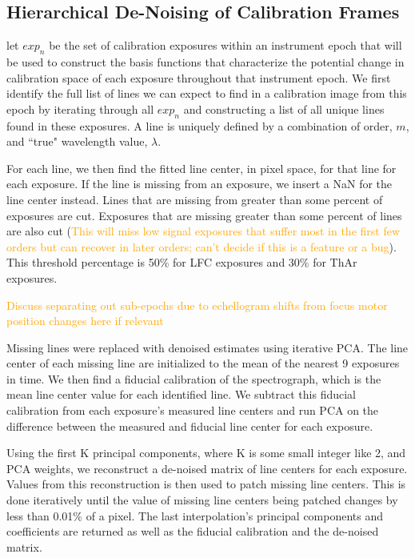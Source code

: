 \documentclass[12pt, letterpaper]{article}
\newcommand{\lz}[1]{\textcolor{orange}{#1}}
\begin{document}
\subsection{Hierarchical De-Noising of Calibration Frames}
let ${exp_n}$ be the set of calibration exposures within an instrument epoch that will be used to construct the basis functions that characterize the potential change in calibration space of each exposure throughout that instrument epoch.  We first identify the full list of lines we can expect to find in a calibration image from this epoch by iterating through all ${exp_n}$ and constructing a list of all unique lines found in these exposures.  A line is uniquely defined by a combination of order, $m$, and ``true" wavelength value, $\lambda$.

For each line, we then find the fitted line center, in pixel space, for that line for each exposure.  If the line is missing from an exposure, we insert a NaN for the line center instead.  Lines that are missing from greater than some percent of exposures are cut.  Exposures that are missing greater than some percent of lines are also cut (\lz{This will miss low signal exposures that suffer most in the first few orders but can recover in later orders; can't decide if this is a feature or a bug}).  This threshold percentage is 50\% for LFC exposures and 30\% for ThAr exposures.

\lz{Discuss separating out sub-epochs due to echellogram shifts from focus motor position changes here if relevant}

Missing lines were replaced with denoised estimates using iterative PCA.  The line center of each missing line are initialized to the mean of the nearest 9 exposures in time.  We then find a fiducial calibration of the spectrograph, which is the mean line center value for each identified line.  We subtract this fiducial calibration from each exposure's measured line centers and run PCA on the difference between the measured and fiducial line center for each exposure.

Using the first K principal components, where K is some small integer like 2, and PCA weights, we reconstruct a de-noised matrix of line centers for each exposure.  Values from this reconstruction is then used to patch missing line centers.  This is done iteratively until the value of missing line centers being patched changes by less than 0.01\% of a pixel.  The last interpolation's principal components and coefficients are returned as well as the fiducial calibration and the de-noised matrix.
\end{document}
